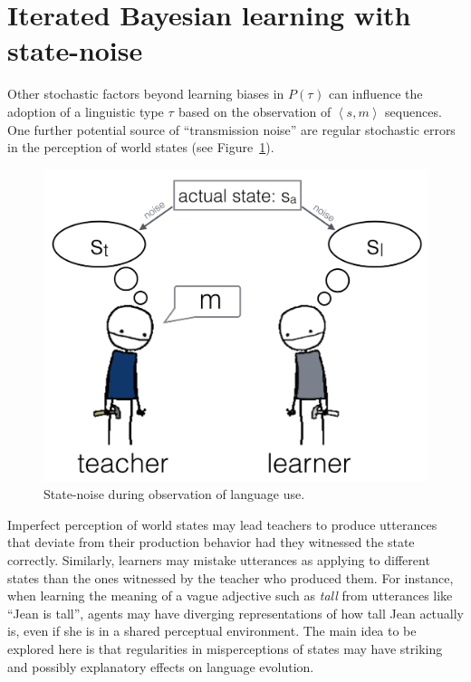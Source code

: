\documentclass[10pt,a4paper]{article}
\newcommand{\tuple}[1]{\ensuremath{\left\langle #1 \right\rangle}}
\newcommand{\type}[1]{\ensuremath{\tau_{#1}}}
\begin{document}

\section{Iterated Bayesian learning with state-noise}

Other stochastic factors beyond learning biases in $P(\type{})$ can influence the adoption of a
linguistic type $\type{}$ based on the observation of $\tuple{s,m}$ sequences. One further potential source
of ``transmission noise'' are regular stochastic errors in the perception of world states (see
Figure~\ref{fig:cartoon}).
%
\begin{figure}[t]
  \centering
  \includegraphics[width = 0.75\linewidth]{pics/cartoon_picture.png}
  \caption{State-noise during observation of language use.}
  \label{fig:cartoon}
\end{figure}
% 
Imperfect perception of world states may lead teachers to produce utterances that deviate from
their production behavior had they witnessed the state correctly. Similarly, learners may
mistake utterances as applying to different states than the ones witnessed by the teacher who
produced them. For instance, when learning the meaning of a vague adjective such as {\em tall}
from utterances like ``Jean is tall'', agents may have diverging representations of how tall
Jean actually is, even if she is in a shared perceptual environment. The main idea to be
explored here is that regularities in misperceptions of states may have striking and possibly
explanatory effects on language evolution.
\end{document}
